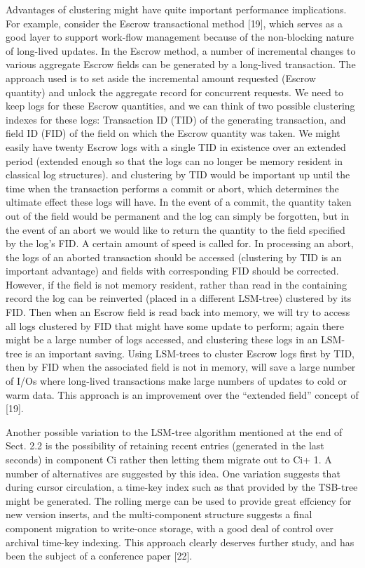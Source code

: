 \documentclass[a4paper,12pt,notitlepage,twoside,openright]{article}
\begin{document}
Advantages of clustering might have quite important performance
implications. For example, consider the Escrow transactional method
{[}19{]}, which serves as a good layer to support work-flow management
because of the non-blocking nature of long-lived updates. In the Escrow
method, a number of incremental changes to various aggregate Escrow
fields can be generated by a long-lived transaction. The approach used
is to set aside the incremental amount requested (Escrow quantity) and
unlock the aggregate record for concurrent requests. We need to keep
logs for these Escrow quantities, and we can think of two possible
clustering indexes for these logs: Transaction ID (TID) of the
generating transaction, and field ID (FID) of the field on which the
Escrow quantity was taken. We might easily have twenty Escrow logs with
a single TID in existence over an extended period (extended enough so
that the logs can no longer be memory resident in classical log
structures). and clustering by TID would be important up until the time
when the transaction performs a commit or abort, which determines the
ultimate effect these logs will have. In the event of a commit, the
quantity taken out of the field would be permanent and the log can
simply be forgotten, but in the event of an abort we would like to
return the quantity to the field specified by the log's FID. A certain
amount of speed is called for. In processing an abort, the logs of an
aborted transaction should be accessed (clustering by TID is an
important advantage) and fields with corresponding FID should be
corrected. However, if the field is not memory resident, rather than
read in the containing record the log can be reinverted (placed in a
different LSM-tree) clustered by its FID. Then when an Escrow field is
read back into memory, we will try to access all logs clustered by FID
that might have some update to perform; again there might be a large
number of logs accessed, and clustering these logs in an LSM-tree is an
important saving. Using LSM-trees to cluster Escrow logs first by TID,
then by FID when the associated field is not in memory, will save a
large number of I/Os where long-lived transactions make large numbers of
updates to cold or warm data. This approach is an improvement over the
``extended field'' concept of {[}19{]}.

Another possible variation to the LSM-tree algorithm mentioned at the
end of Sect. 2.2 is the possibility of retaining recent entries
(generated in the last seconds) in component Ci rather then letting them
migrate out to Ci+ 1. A number of alternatives are suggested by this
idea. One variation suggests that during cursor circulation, a time-key
index such as that provided by the TSB-tree might be generated. The
rolling merge can be used to provide great effciency for new version
inserts, and the multi-component structure suggests a final component
migration to write-once storage, with a good deal of control over
archival time-key indexing. This approach clearly deserves further
study, and has been the subject of a conference paper {[}22{]}.
\end{document}
